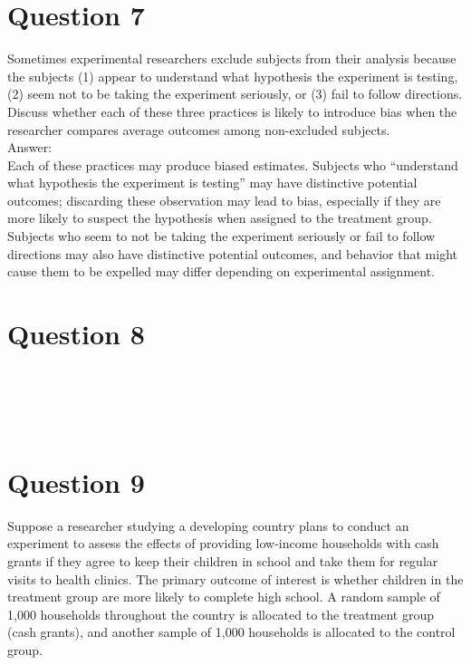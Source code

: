 \documentclass[11pt,notitlepage]{article}\usepackage[]{graphicx}\usepackage[]{color}
\makeatletter
\newenvironment{kframe}{%
 \def\at@end@of@kframe{}%
 \ifinner\ifhmode%
  \def\at@end@of@kframe{\end{minipage}}%
  \begin{minipage}{\columnwidth}%
 \fi\fi%
 \def\FrameCommand##1{\hskip\@totalleftmargin \hskip-\fboxsep
 \colorbox{shadecolor}{##1}\hskip-\fboxsep
     \hskip-\linewidth \hskip-\@totalleftmargin \hskip\columnwidth}%
 \MakeFramed {\advance\hsize-\width
   \@totalleftmargin\z@ \linewidth\hsize
   \@setminipage}}%
 {\par\unskip\endMakeFramed%
 \at@end@of@kframe}
\newenvironment{knitrout}{}{} %
\makeatother
\begin{document}
\section*{Question 7}
Sometimes experimental researchers exclude subjects from their analysis because the subjects (1) appear to understand what hypothesis the experiment is testing, (2) seem not to be taking the experiment seriously, or (3) fail to follow directions. Discuss whether each of these three practices is likely to introduce bias when the researcher compares average outcomes among non-excluded subjects.\\
Answer:\\
Each of these practices may produce biased estimates. Subjects who ``understand what hypothesis the experiment is testing'' may have distinctive potential outcomes; discarding these observation may lead to bias, especially if they are more likely to suspect the hypothesis when assigned to the treatment group. Subjects who seem to not be taking the experiment seriously or fail to follow directions may also have distinctive potential outcomes, and behavior that might cause them to be expelled may differ depending on experimental assignment.


\section*{Question 8}
\begin{knitrout}
\color{fgcolor}\begin{kframe}
\begin{verbatim}





\end{verbatim}
\end{kframe}
\end{knitrout}

\section*{Question 9}
Suppose a researcher studying a developing country plans to conduct an experiment to assess the effects of providing low-income households with cash grants if they agree to keep their children in school and take them for regular visits to health clinics. The primary outcome of interest is whether children in the treatment group are more likely to complete high school. A random sample of 1,000 households throughout the country is allocated to the treatment group (cash grants), and another sample of 1,000 households is allocated to the control group.
\end{document}
